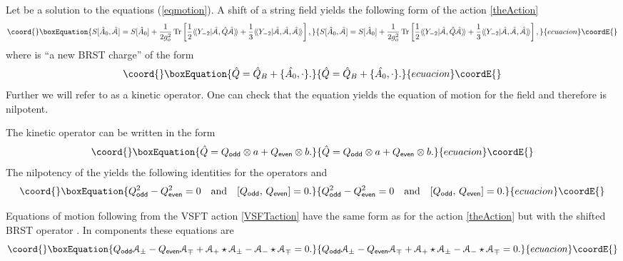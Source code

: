 \documentclass[a4paper,12pt]{article}
\providecommand{\ra}{\rightarrow}
\providecommand{\Ac}{\mathcal{A}}
\providecommand{\Tr}{\mathop{\mathrm{Tr}}\nolimits}
\providecommand{\la}{\langle\!\langle}
\renewcommand{\ra}{\rangle\!\rangle}
\begin{document}
Let \coordHE{} be a solution to the equations (\ref{eqmotion}).
A shift of a string field \myHighlight{$
\hat{A}=\hat{A}_0+\hat{\Ac}
$}\coordHE{} yields the following form of the action
\eqref{theAction}
\begin{equation}\coord{}\boxEquation{
S[\hat{A}_0,\hat{\Ac}]=S[\hat{A}_0]+\frac{1}{2g_o^2}\Tr\left[\frac{1}{2}\la Y_{-2}|\hat{\Ac}, \hat{Q}\hat{\Ac}\ra
+\frac13\la Y_{-2}|\hat{\Ac},\hat{\Ac}, \hat{\Ac}\ra\right],
\label{VSFTaction}
}{
S[\hat{A}_0,\hat{\Ac}]=S[\hat{A}_0]+\frac{1}{2g_o^2}\Tr\left[\frac{1}{2}\la Y_{-2}|\hat{\Ac}, \hat{Q}\hat{\Ac}\ra
+\frac13\la Y_{-2}|\hat{\Ac},\hat{\Ac}, \hat{\Ac}\ra\right],
}{ecuacion}\coordE{}\end{equation}
where \coordHE{} is ``a new BRST charge'' of the form
\begin{equation}\coord{}\boxEquation{
\hat{Q}=\hat{Q}_B+\{\hat{A_0},\cdot\}.
\label{shift:BRST}
}{
\hat{Q}=\hat{Q}_B+\{\hat{A_0},\cdot\}.
}{ecuacion}\coordE{}\end{equation}
Further we will refer to \coordHE{} as a kinetic operator.
One can check that the equation \coordHE{}
yields the equation of motion for the field \coordHE{} and
therefore \coordHE{} is nilpotent.

The kinetic operator can be written in the form
\begin{equation}\coord{}\boxEquation{
\hat{Q}=Q_{\textsf{odd}}\otimes a+Q_{\textsf{even}}\otimes b.
\label{abg:100}
}{
\hat{Q}=Q_{\textsf{odd}}\otimes a+Q_{\textsf{even}}\otimes b.
}{ecuacion}\coordE{}\end{equation}
The nilpotency of the \coordHE{}
yields the following identities for the operators \coordHE{}
and \coordHE{}
\begin{equation}\coord{}\boxEquation{
Q_{\textsf{odd}}^2-Q_{\textsf{even}}^2=0\quad\text{and}\quad
[Q_{\textsf{odd}},\,Q_{\textsf{even}}]=0.
\label{eqBRST}
}{
Q_{\textsf{odd}}^2-Q_{\textsf{even}}^2=0\quad\text{and}\quad
[Q_{\textsf{odd}},\,Q_{\textsf{even}}]=0.
}{ecuacion}\coordE{}\end{equation}

Equations of motion following from the VSFT action \eqref{VSFTaction}
have the same form as for the action \eqref{theAction} but with the shifted BRST operator \coordHE{}.
In components these equations are
\begin{equation}\coord{}\boxEquation{
Q_{\textsf{odd}}\Ac_{\pm}-Q_{\textsf{even}}\Ac_{\mp}+\Ac_+\star \Ac_{\pm}
-\Ac_-\star \Ac_{\mp}=0.
\label{eqmotion-cal'}
}{
Q_{\textsf{odd}}\Ac_{\pm}-Q_{\textsf{even}}\Ac_{\mp}+\Ac_+\star \Ac_{\pm}
-\Ac_-\star \Ac_{\mp}=0.
}{ecuacion}\coordE{}\end{equation}
\end{document}

